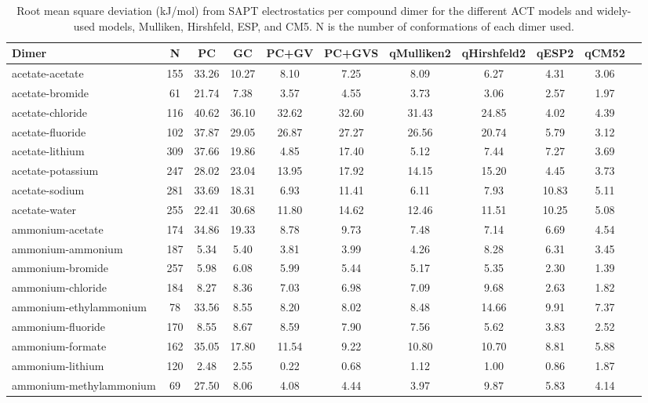 \begin{longtable}{lcccccccccc}
\caption{Root mean square deviation (kJ/mol) from SAPT electrostatics per compound dimer for the different ACT models and widely-used models, Mulliken, Hirshfeld, ESP, and CM5. N is the number of conformations of each dimer used.}\\
\hline
Dimer & N  & PC & GC & PC+GV & PC+GVS & qMulliken2 & qHirshfeld2 & qESP2 & qCM52\\
\hline
acetate-acetate & 155  & 33.26 & 10.27 & 8.10 & 7.25 & 8.09 & 6.27 & 4.31 & 3.06\\
acetate-bromide & 61  & 21.74 & 7.38 & 3.57 & 4.55 & 3.73 & 3.06 & 2.57 & 1.97\\
acetate-chloride & 116  & 40.62 & 36.10 & 32.62 & 32.60 & 31.43 & 24.85 & 4.02 & 4.39\\
acetate-fluoride & 102  & 37.87 & 29.05 & 26.87 & 27.27 & 26.56 & 20.74 & 5.79 & 3.12\\
acetate-lithium & 309  & 37.66 & 19.86 & 4.85 & 17.40 & 5.12 & 7.44 & 7.27 & 3.69\\
acetate-potassium & 247  & 28.02 & 23.04 & 13.95 & 17.92 & 14.15 & 15.20 & 4.45 & 3.73\\
acetate-sodium & 281  & 33.69 & 18.31 & 6.93 & 11.41 & 6.11 & 7.93 & 10.83 & 5.11\\
acetate-water & 255  & 22.41 & 30.68 & 11.80 & 14.62 & 12.46 & 11.51 & 10.25 & 5.08\\
ammonium-acetate & 174  & 34.86 & 19.33 & 8.78 & 9.73 & 7.48 & 7.14 & 6.69 & 4.54\\
ammonium-ammonium & 187  & 5.34 & 5.40 & 3.81 & 3.99 & 4.26 & 8.28 & 6.31 & 3.45\\
ammonium-bromide & 257  & 5.98 & 6.08 & 5.99 & 5.44 & 5.17 & 5.35 & 2.30 & 1.39\\
ammonium-chloride & 184  & 8.27 & 8.36 & 7.03 & 6.98 & 7.09 & 9.68 & 2.63 & 1.82\\
ammonium-ethylammonium & 78  & 33.56 & 8.55 & 8.20 & 8.02 & 8.48 & 14.66 & 9.91 & 7.37\\
ammonium-fluoride & 170  & 8.55 & 8.67 & 8.59 & 7.90 & 7.56 & 5.62 & 3.83 & 2.52\\
ammonium-formate & 162  & 35.05 & 17.80 & 11.54 & 9.22 & 10.80 & 10.70 & 8.81 & 5.88\\
ammonium-lithium & 120  & 2.48 & 2.55 & 0.22 & 0.68 & 1.12 & 1.00 & 0.86 & 1.87\\
ammonium-methylammonium & 69  & 27.50 & 8.06 & 4.08 & 4.44 & 3.97 & 9.87 & 5.83 & 4.14\\

\end{longtable}
